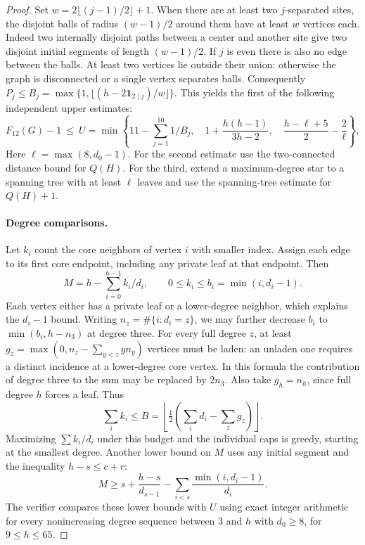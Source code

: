 \documentclass[11pt,a4paper]{article}
\begin{document}
\begin{proof}
Set $w=2\lfloor(j-1)/2\rfloor+1$. When there are at least two
$j$-separated sites, the disjoint balls of radius $(w-1)/2$ around
them have at least $w$ vertices each. Indeed two internally disjoint
paths between a center and another site give two disjoint initial
segments of length $(w-1)/2$. If $j$ is even there is also no edge
between the balls. At least two vertices lie outside their union:
otherwise the graph is disconnected or a single vertex separates balls.
Consequently $P_j\le B_j=\max\{1,\lfloor(h-2\mathbf1_{2\mid j})/w\rfloor\}$.
This yields the first of the following independent upper estimates:
\[
 F_{12}(G)-1\ \le\ U=\min\left\{
 11-\sum_{j=1}^{10}1/B_j,\quad
 1+\frac{h(h-1)}{3h-2},\quad
 \frac{h-\ell+5}2-\frac2\ell\right\},
\]
Here $\ell=\max(8,d_0-1)$. For the second estimate use the two-connected distance bound for $Q(H)$.
For the third, extend a maximum-degree star to a spanning tree with at
least $\ell$ leaves and use the spanning-tree estimate for $Q(H)+1$.

\paragraph{Degree comparisons.}
Let $k_i$ count the core neighbors of vertex $i$ with smaller index.
Assign each edge to its first core endpoint, including any private
leaf at that endpoint. Then
\[
 M=h-\sum_{i=0}^{h-1} k_i/d_i,\qquad
 0\le k_i\le b_i=\min(i,d_i-1).
\]
Each vertex either has a private leaf or a lower-degree neighbor,
which explains the $d_i-1$ bound. Writing $n_z=\#\{i:d_i=z\}$,
we may further decrease $b_i$ to $\min(b_i,h-n_3)$ at degree three.
For every full degree $z$, at least
$g_z=\max(0,n_z-\sum_{y<z} y n_y)$ vertices must be laden:
an unladen one requires a distinct incidence at a lower-degree core
vertex. In this formula the contribution of degree three to the sum
may be replaced by $2n_3$. Also take $g_h=n_h$, since full degree $h$
forces a leaf. Thus
\[
 \sum_i k_i \le B=\left\lfloor
 \tfrac12(\textstyle\sum_i d_i-\sum_z g_z)\right\rfloor.
\]
Maximizing $\sum k_i/d_i$ under this budget and the individual caps
is greedy, starting at the smallest degree. Another lower bound on
$M$ uses any initial segment and the inequality $h-s\le c+r$:
\[
 M\ge s+\frac{h-s}{d_{s-1}}-\sum_{i<s}\frac{\min(i,d_i-1)}{d_i}.
\]
The verifier compares these lower bounds with $U$ using exact integer
arithmetic for every nonincreasing degree sequence between $3$ and $h$
with $d_0\ge8$, for $9\le h\le65$.


\end{proof}
\end{document}
